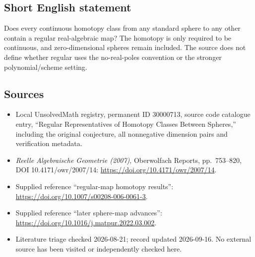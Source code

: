 \documentclass[11pt]{article}
\begin{document}
\subsection{Short English statement}
Does every continuous homotopy class from any standard sphere to any other contain a regular real-algebraic map? The homotopy is only required to be continuous, and zero-dimensional spheres remain included. The source does not define whether regular uses the no-real-poles convention or the stronger polynomial/scheme setting.
\subsection{Sources}
\begin{itemize}
\item Local UnsolvedMath registry, permanent ID 30000713, source code catalogue entry, ``Regular Representatives of Homotopy Classes Between Spheres,'' including the original conjecture, all nonnegative dimension pairs and verification metadata.
\item \emph{Reelle Algebraische Geometrie (2007)}, Oberwolfach Reports, pp.\ 753--820, DOI 10.4171/owr/2007/14: \url{https://doi.org/10.4171/owr/2007/14}.
\item Supplied reference ``regular-map homotopy results'': \url{https://doi.org/10.1007/s00208-006-0061-3}.
\item Supplied reference ``later sphere-map advances'': \url{https://doi.org/10.1016/j.matpur.2022.03.002}.
\item Literature triage checked 2026-08-21; record updated 2026-09-16. No external source has been visited or independently checked here.
\end{itemize}
\end{document}
